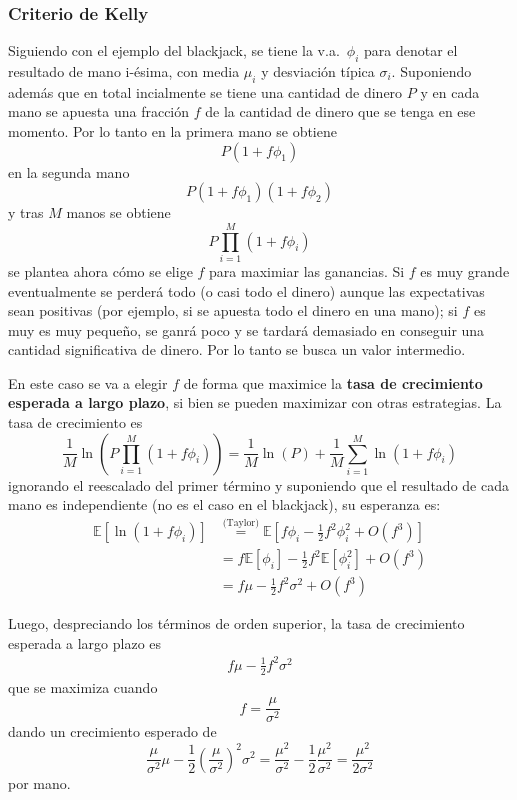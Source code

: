 \subsubsection{Criterio de Kelly}
Siguiendo con el ejemplo del blackjack, se tiene la v.a.\ $\phi_i$ para denotar el resultado de mano i-ésima, con media $\mu_i$ y desviación típica $\sigma_i$. Suponiendo además que en total incialmente se tiene una cantidad de dinero $P$ y en cada mano se apuesta una fracción $f$ de la cantidad de dinero que se tenga en ese momento. Por lo tanto en la primera mano se obtiene
\[
    P(1+f\phi_1)
\]
en la segunda mano
\[
    P(1+f\phi_1)(1+f\phi_2)
\]
y tras $M$ manos se obtiene
\[
    P\prod_{i=1}^M (1+f\phi_i)
\]
se plantea ahora cómo se elige $f$ para maximiar las ganancias. Si $f$ es muy grande eventualmente se perderá todo (o casi todo el dinero) aunque las expectativas sean positivas (por ejemplo, si se apuesta todo el dinero en una mano); si $f$ es muy es muy pequeño, se ganrá poco y se tardará demasiado en conseguir una cantidad significativa de dinero. Por lo tanto se  busca un valor intermedio.

En este caso se va a elegir $f$ de forma que maximice la \textbf{tasa de crecimiento esperada a largo plazo}, si bien se pueden maximizar con otras estrategias. La tasa de crecimiento es
\[
    \frac{1}{M} \ln\left(  P\prod_{i=1}^M (1+f\phi_i)\right) = \frac{1}{M} \ln(P) + \frac{1}{M} \sum_{i=1}^M \ln(1+f\phi_i)
\]
ignorando el reescalado del primer término y suponiendo que el resultado de cada mano es independiente (no es el caso en el blackjack), su esperanza es:
\begin{align*}
    \mathbb{E}[\ln(1+f\phi_i)] &\overset{\text{(Taylor)}}{=} \mathbb{E}[f\phi_i - \frac{1}{2}f^2\phi_i^2 + O(f^3)] \\
    &= f\mathbb{E}[\phi_i] - \frac{1}{2}f^2\mathbb{E}[\phi_i^2] + O(f^3) \\
    &= f\mu - \frac{1}{2}f^2\sigma^2 + O(f^3)
\end{align*}

Luego, despreciando los términos de orden superior, la tasa de crecimiento esperada a largo plazo es
\begin{align}\label{eq:KellyGrowth}
    f\mu - \frac{1}{2}f^2\sigma^2
\end{align}
que se maximiza cuando
\[
    \boxed{f = \frac{\mu}{\sigma^2}}
\]
dando un crecimiento esperado de
\[
    \frac{\mu}{\sigma^2}\mu - \frac{1}{2}\left(\frac{\mu}{\sigma^2}\right)^2\sigma^2 = \frac{\mu^2}{\sigma^2} - \frac{1}{2}\frac{\mu^2}{\sigma^2} = \boxed{\frac{\mu^2}{2\sigma^2}}
\]
por mano.

